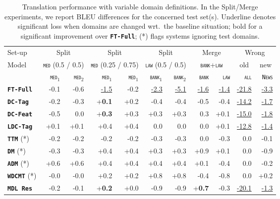 \documentclass[11pt,a4paper]{article}
\newcommand{\fyDone}[1]{\done[FY]\Todo[FY:]{\textcolor{orange}{#1}}}
\newcommand{\domain}[1]{\texttt{\textsc{#1}}}
\newcommand{\system}[1]{\texttt{\textbf{#1}}}
\newcommand{\SB}[1]{\textbf{#1}}
\newcommand{\SW}[1]{\underline{#1}}
\begin{document}
\begin{table*}
  \centering%
  \begin{tabular}{|p{1.8cm}|*{10}{r|}} \hline
    \hfill Set-up & \multicolumn{2}{c|}{Split} &  \multicolumn{2}{c|}{Split} & \multicolumn{2}{c|}{Split} & \multicolumn{2}{c|}{Merge} & \multicolumn{2}{c|}{Wrong} \\ %
     Model \hfill & \multicolumn{2}{c|}{\domain{med} \footnotesize{(0.5 / 0.5)}} &  \multicolumn{2}{c|}{\domain{med} {\footnotesize (0.25 / 0.75)}} & \multicolumn{2}{c|}{\domain{law} {\footnotesize (0.5 / 0.5)}} & \multicolumn{2}{c|}{\domain{bank}+\domain{law}} &  \multicolumn{1}{c|}{old} &  \multicolumn{1}{c|}{new}\\ \hline
    & \domain{med}$_1$ & \domain{med}$_2$ & \domain{med}$_1$ & \domain{med}$_1$ &  \domain{bank}$_1$ & \domain{bank}$_2$ & \domain{bank} & \domain{law}   & \domain{all} & \domain{News} \\
    \system{FT-Full}      & -0.1 & -0.6 & \SW{-1.5} & -0.2& \SW{-2.3} & \SW{-5.1} &\SW{-1.6} & \SW{-1.4}& \SW{-21.8} & \SW{-3.3}\\%
    \system{DC-Tag}     & -0.2 & -0.3& +\SB{0.1}  & +0.2& -0.4 & -0.4 & -0.5 & -0.4 & \SW{-14.2} & \SW{-1.7}\\%
    \system{DC-Feat}    & -0.5 & 0.0 & +\SB{0.3}   & +0.3 & +0.3 & +0.3 & 0.3 & +0.1 & \SW{-15.0} &\SW{-1.8}\\ %
    \system{LDC-Tag}   & +0.1 & +0.1 & +0.4 & +0.4 & 0.0 &  0.0 &  0.0 & +0.1& \SW{-12.8} & \SW{-1.4}\\ %
    \system{TTM} (*)        & -0.2 &  -0.2 & -0.2 & -0.2 & -0.3 &-0.3 &  0.0 & -0.3 & 0.0 & -0.1\\
    \system{DM} (*)           & -0.3   & -0.3  & +0.4 & +0.4 & +0.3 & +0.3 & +0.9 & +0.1 & 0.0 &-0.9\\
    \system{ADM} (*)        & +0.6   & +0.6 & +0.4 & +0.4 & +0.4 & +0.4 &  +0.1 & -0.4 & 0.0&-0.2\\
    \system{WDCMT} (*)     & -0.0    & -0.0  & +0.2 & +0.2  & +0.8 & +0.8  & -0.4 & -0.8 & 0.0 & +0.2 \\
    \system{MDL Res}   & -0.2   & -0.1 & +\SB{0.2} &+0.0 & -0.9 & -0.9 & +\SB{0.7} & -0.3 & \SW{-20.1} & \SW{-1.3}\\ %
    \hline
  \end{tabular}
  \caption{Translation performance with variable domain definitions. In the Split/Merge experiments, we report BLEU differences for the concerned test set(s). Underline denotes significant loss when domains are changed wrt.\ the baseline situation; bold for a significant improvement over \system{FT-Full}; (*) flags systems ignoring test domains.
    \fyDone{Check wrong and significance of diff for ``old''}\fyDone{How about wrong ?}
  }
  \label{tab:redomains}
\end{table*}
\end{document}
